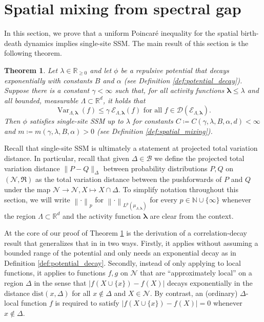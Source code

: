 \documentclass[10pt]{amsart}
\newtheorem{theorem}{Theorem}[section]
\theoremstyle{definition}
\theoremstyle{remark}
\newcommand{\pointsets}{\mathcal{N}}
\newcommand{\events}{\mathfrak{R}}
\newcommand{\dirichlet}{\mathcal{E}}
\newcommand{\dist}{\mathrm{dist}}
\newcommand{\N}{\mathbb{N}}
\newcommand{\R}{\mathbb{R}}
\newcommand{\region}{\Lambda}
\newcommand{\potential}{\phi}
\newcommand{\activity}{\lambda}
\newcommand{\activities}{\pmb{\lambda}}
\newcommand{\borel}{\mathcal{B}}
\newcommand{\domain}{\mathcal{D}}
\newcommand{\norm}[1]{\left\lVert#1\right\rVert}
\newcommand{\Var}{{\operatorname{Var}}}
\begin{document}
	\section{Spatial mixing from spectral gap} \label{sec:spatial-mixing}
	In this section, we prove that a uniform Poincaré inequality for the spatial birth-death dynamics implies single-site SSM.
	The main result of this section is the following theorem.
	\begin{theorem} \label{thm:ssssm}
		Let $\activity \in \R_{\ge 0}$ and let $\potential$ be a repulsive potential that decays exponentially with constants $B$ and $\alpha$ (see Definition \ref{def:potential_decay}).
		Suppose there is a constant $\gamma < \infty$ such that, for all activity functions $\activities \le \activity$ and all bounded, measurable $\region \subset \R^d$, it holds that
		\[
		\Var_{\region, \activities}(f) \leq \gamma \ \dirichlet_{\region, \activities}(f)  \text{ for all } f \in \domain(\dirichlet_{\region, \activities}).
		\]
		Then $\potential$ satisfies single-site SSM up to $\activity$ for constants $C \coloneqq C(\gamma,\activity, B, \alpha, d) < \infty$ and $m \coloneqq m(\gamma, \activity, B, \alpha) > 0$ (see Definition \ref{def:spatial_mixing}).
	\end{theorem}
	
	Recall that single-site SSM is ultimately a statement at projected total variation distance.  In particular, recall that given $\Delta \in \borel$ we define the projected total variation distance $\|{P - Q}\|_{\Delta}$ between probability distributions $P, Q$ on $(\pointsets, \events)$ as the total variation distance between the pushforwards of $P$ and $Q$ under the map $\pointsets \to \pointsets, X \mapsto X \cap \Delta$.  To simplify notation throughout this section, we will write $\norm{\cdot}_{p}$ for $\norm{\cdot}_{L^p(\mu_{\region, \activities})}$ for every $p \in \N \cup \{\infty\}$ whenever the region $\region \subset \R^d$ and the activity function $\activities$ are clear from the context.
	
	
	At the core of our proof of Theorem \ref{thm:ssssm} is the derivation of a correlation-decay result that generalizes that in \cite[Theorem 4.1]{bertini2002spectral} in two ways. 
	Firstly, it applies without assuming a bounded range of the potential and only needs an exponential decay as in Definition \ref{def:potential_decay}. Secondly, instead of only applying to local functions, it applies to functions $f,g$ on $\pointsets$ that are ``approximately local'' on a region $\Delta$ in the sense that $|f(X \cup \{x\}) - f(X)|$ decays exponentially in the distance $\dist(x, \Delta)$ for all $x \notin \Delta$ and $X \in \pointsets$. By contrast, an (ordinary) $\Delta$-local function $f$ is required to satisfy $|f(X \cup \{x\}) - f(X)| = 0$ whenever $x \notin \Delta$. 
	
\end{document}
